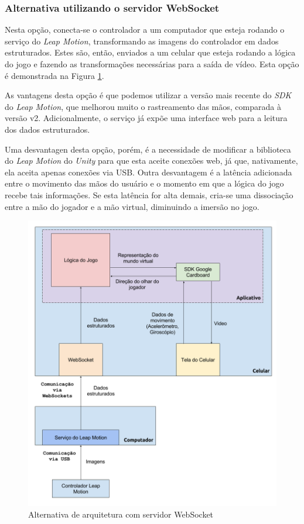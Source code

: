 \subsubsection{Alternativa utilizando o servidor WebSocket}\label{subsubsec-arquiteturas-leapmotion-pc-leapdata-android}

Nesta opção, conecta-se o controlador a um computador que esteja rodando o serviço do \textit{Leap Motion}, transformando as imagens do controlador em dados estruturados. Estes são, então, enviados a um celular que esteja rodando a lógica do jogo e fazendo as transformações necessárias para a saída de vídeo. Esta opção é demonstrada na Figura \ref{fig:arquitetura-leap-pc-leapdata-android}.

As vantagens desta opção é que podemos utilizar a versão mais recente do \textit{SDK} do \textit{Leap Motion}, que melhorou muito o rastreamento das mãos, comparada à versão v2. Adicionalmente, o serviço já expõe uma interface web para a leitura dos dados estruturados. 

Uma desvantagen desta opção, porém, é a necessidade de modificar a biblioteca do \textit{Leap Motion} do \textit{Unity} para que esta aceite conexões web, já que, nativamente, ela aceita apenas conexões via USB. Outra desvantagem é a latência adicionada entre o movimento das mãos do usuário e o momento em que a lógica do jogo recebe tais informações. Se esta latência for alta demais, cria-se uma dissociação entre a mão do jogador e a mão virtual, diminuindo a imersão no jogo.

\begin{figure}[h]
	\centering
	\includegraphics[width=0.7\linewidth]{images/Arquitetura-leap-pc-leapdata-android}
	\caption{Alternativa de arquitetura com servidor WebSocket}
	\label{fig:arquitetura-leap-pc-leapdata-android}
\end{figure}

